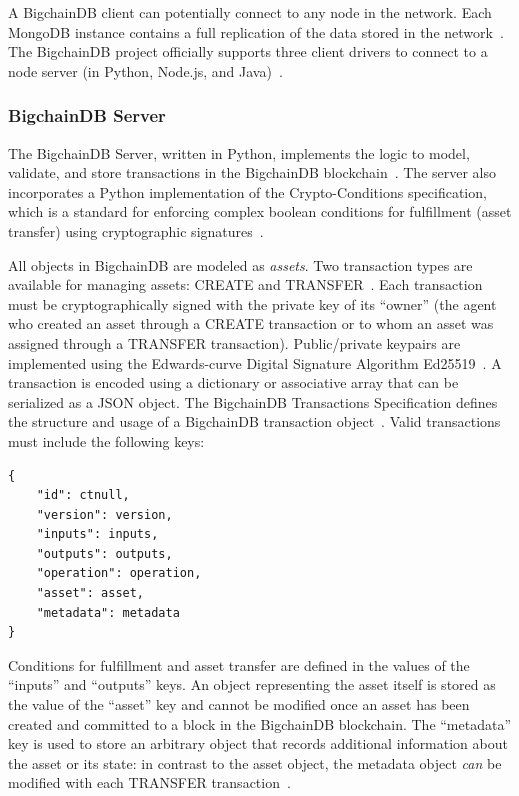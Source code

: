 A BigchainDB client can potentially connect to any node in the network.
Each MongoDB instance contains a full replication of the data stored in the
network~\cite{bdb18}. The BigchainDB project officially supports three
client drivers to connect to a node server (in Python, Node.js, and
Java)~\cite{bdb18f}.

\subsubsection{BigchainDB Server}
The BigchainDB Server, written in Python, implements the logic to
model, validate, and store transactions in the BigchainDB
blockchain~\cite{troyM18b}. The server also incorporates a Python
implementation of the Crypto-Conditions specification, which is a standard
for enforcing complex boolean conditions for fulfillment (asset transfer)
using cryptographic signatures~\cite{cryptocon}.

All objects in BigchainDB are modeled as \emph{assets}. Two transaction types 
are available for managing assets: CREATE and TRANSFER~\cite{troyM18c}. Each 
transaction must be cryptographically signed with the private key of its 
``owner'' (the agent who created an asset through a CREATE transaction or to 
whom an asset was assigned through a TRANSFER transaction). Public/private 
keypairs are implemented using the Edwards-curve Digital Signature Algorithm 
Ed25519~\cite{troyM18c}. A transaction is encoded using a dictionary or 
associative array that can be serialized as a JSON object. The BigchainDB 
Transactions Specification defines the structure and usage of a BigchainDB 
transaction object~\cite{troyM18c}. Valid transactions must include the 
following keys:

\begin{verbatim}
{
    "id": ctnull,
    "version": version,
    "inputs": inputs,
    "outputs": outputs,
    "operation": operation,
    "asset": asset,
    "metadata": metadata
}	
\end{verbatim}

Conditions for fulfillment and asset transfer are defined in the values
of the ``inputs'' and ``outputs'' keys. An object representing the asset
itself is stored as the value of the ``asset'' key and cannot be modified
once an asset has been created and committed to a block in the BigchainDB
blockchain. The ``metadata'' key is used to store an arbitrary object that
records additional information about the asset or its state: in contrast to
the asset object, the metadata object \emph{can} be modified with each
TRANSFER transaction~\cite{troyM18c}.

